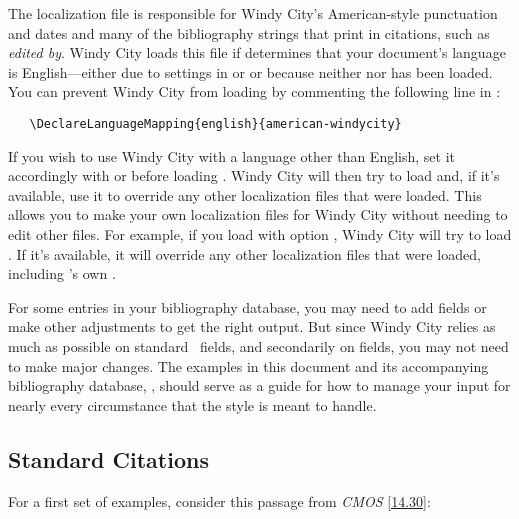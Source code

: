\documentclass[11pt,letterpaper,oneside]{article}
\begin{document}
The localization file  is responsible for
Windy City's American-style punctuation and dates and many of the
bibliography strings that print in citations, such as \textit{edited
by}. Windy City loads this file if \biblatex determines that your
document's language is English---either due to settings in \babel or
\polyglossia or because neither \babel nor \polyglossia has been
loaded. You can prevent Windy City from loading
 by commenting the following line in
:

\begin{verbatim}
   \DeclareLanguageMapping{english}{american-windycity}
\end{verbatim}

If you wish to use Windy City with a language other than English, set
it accordingly with \babel or \polyglossia before loading \biblatex.
Windy City will then try to load  and,
if it's available, use it to override any other localization files
that were loaded. This allows you to make your own localization files
for Windy City without needing to edit other files. For example, if
you load \babel with option , Windy City will try to load
. If it's available, it will override any
other localization files that were loaded, including \biblatex's own
.

For some entries in your bibliography database, you may need to add
fields or make other adjustments to get the right output. But since
Windy City relies as much as possible on standard \BibTeX\ fields, and
secondarily on \biblatex fields, you may not need to make major
changes. The examples in this document and its accompanying
bibliography database, , should serve as a guide
for how to manage your input for nearly every circumstance that the
style is meant to handle.

\subsection{Standard Citations}
\label{standard}

For a first set of examples, consider this passage from \textit{CMOS}
\ref{14.30}:

\begin{citenobib}
\item \cite[24--25]{morley1995}
\item \cite{schwartz1992}
\item \cite{kaiser1964}
\item \cite[43]{morley1995}
\item \cite[138]{schwartz1992}
\item \cite[189--90]{kaiser1964}
\end{citenobib}
\end{document}
